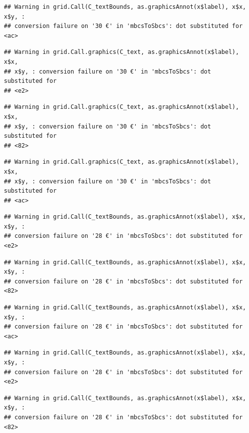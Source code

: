 \documentclass[]{gitbook}
\begin{document}
\begin{verbatim}
## Warning in grid.Call(C_textBounds, as.graphicsAnnot(x$label), x$x, x$y, :
## conversion failure on '30 €' in 'mbcsToSbcs': dot substituted for <ac>
\end{verbatim}

\begin{verbatim}
## Warning in grid.Call.graphics(C_text, as.graphicsAnnot(x$label), x$x,
## x$y, : conversion failure on '30 €' in 'mbcsToSbcs': dot substituted for
## <e2>
\end{verbatim}

\begin{verbatim}
## Warning in grid.Call.graphics(C_text, as.graphicsAnnot(x$label), x$x,
## x$y, : conversion failure on '30 €' in 'mbcsToSbcs': dot substituted for
## <82>
\end{verbatim}

\begin{verbatim}
## Warning in grid.Call.graphics(C_text, as.graphicsAnnot(x$label), x$x,
## x$y, : conversion failure on '30 €' in 'mbcsToSbcs': dot substituted for
## <ac>
\end{verbatim}

\begin{verbatim}
## Warning in grid.Call(C_textBounds, as.graphicsAnnot(x$label), x$x, x$y, :
## conversion failure on '28 €' in 'mbcsToSbcs': dot substituted for <e2>
\end{verbatim}

\begin{verbatim}
## Warning in grid.Call(C_textBounds, as.graphicsAnnot(x$label), x$x, x$y, :
## conversion failure on '28 €' in 'mbcsToSbcs': dot substituted for <82>
\end{verbatim}

\begin{verbatim}
## Warning in grid.Call(C_textBounds, as.graphicsAnnot(x$label), x$x, x$y, :
## conversion failure on '28 €' in 'mbcsToSbcs': dot substituted for <ac>
\end{verbatim}

\begin{verbatim}
## Warning in grid.Call(C_textBounds, as.graphicsAnnot(x$label), x$x, x$y, :
## conversion failure on '28 €' in 'mbcsToSbcs': dot substituted for <e2>
\end{verbatim}

\begin{verbatim}
## Warning in grid.Call(C_textBounds, as.graphicsAnnot(x$label), x$x, x$y, :
## conversion failure on '28 €' in 'mbcsToSbcs': dot substituted for <82>
\end{verbatim}
\end{document}
